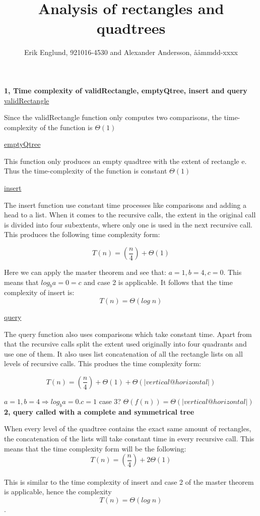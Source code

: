 \documentclass[12pt, a4paper]{article}
\title{Analysis of rectangles and quadtrees}
\author{Erik Englund, 921016-4530 and Alexander Andersson, ååmmdd-xxxx}
\begin{document}
\maketitle

\textbf{1, Time complexity of validRectangle, emptyQtree, insert and query}\\

\underline{validRectangle}

Since the validRectangle function only computes two comparisons, the time-complexity of the function is 
$\Theta(1)$




\underline{emptyQtree}

This function only produces an empty quadtree with the extent of rectangle e. Thus the time-complexity of the function is constant $\Theta(1)$



\underline{insert}

The insert function use constant time processes like comparisons and adding a head to a list. When it comes to the recursive calls, the extent in the original call is divided into four subextents, where only one is used in the next recursive call. This produces the following time complexity form:

$$T(n)=\left(\frac{n}{4}\right)+\Theta(1)$$

Here we can apply the master theorem and see that: $a=1, b=4, c=0$. This means that $log_ba=0 = c$ and case 2 is applicable. It follows that the time complexity of insert is: $$T(n)=\Theta(log\;n)$$





\underline{query}

The query function also uses comparisons which take constant time. Apart from that the recursive calls split the extent used originally into four quadrants and use one of them. It also uses list concatenation of all the rectangle lists on all levels of recursive calls. This produes the time complexity form:

$$T(n)=\left(\frac{n}{4}\right)+\Theta(1)+\Theta(|vertical@horizontal|)$$

$a=1, b=4 \Rightarrow log_ba=0. c = 1$
case 3? $\Theta(f(n))=\Theta(|vertical@horizontal|)$
\\
\textbf{2, query called with a complete and symmetrical tree}

When every level of the quadtree contains the exact same amount of rectangles, the concatenation of the lists will take constant time in every recursive call. This means that the time complexity form will be the following: $$T(n)=\left(\frac{n}{4}\right)+2\Theta(1)$$\\

This is similar to the time complexity of insert and case 2 of the master theorem is applicable, hence the complexity $$T(n)=\Theta(log\;n)$$.
\end{document}
